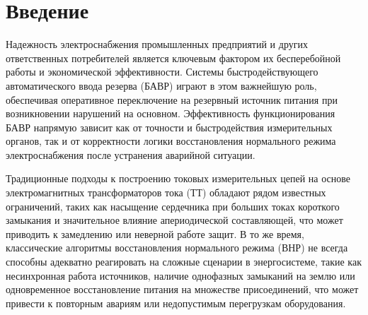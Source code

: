 
\section{Введение}\label{sec:ch2_intro}

Надежность электроснабжения промышленных предприятий и других ответственных потребителей является ключевым фактором их бесперебойной работы и экономической эффективности. Системы быстродействующего автоматического ввода резерва (БАВР) играют в этом важнейшую роль, обеспечивая оперативное переключение на резервный источник питания при возникновении нарушений на основном. Эффективность функционирования БАВР напрямую зависит как от точности и быстродействия измерительных органов, так и от корректности логики восстановления нормального режима электроснабжения после устранения аварийной ситуации.\par\vspace{0.2cm}

Традиционные подходы к построению токовых измерительных цепей на основе электромагнитных
трансформаторов тока (ТТ) обладают рядом известных ограничений, таких как насыщение
сердечника при больших токах короткого замыкания и значительное влияние апериодической
составляющей, что может приводить к замедлению или неверной работе защит. В то же время,
классические алгоритмы восстановления нормального режима (ВНР) не всегда способны
адекватно реагировать на сложные сценарии в энергосистеме, такие как несинхронная работа
источников, наличие однофазных замыканий на землю или одновременное восстановление
питания на множестве присоединений, что может привести к повторным авариям или
недопустимым перегрузкам оборудования.\par\vspace{0.2cm}

